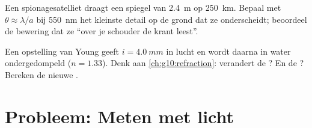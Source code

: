 \begin{exercise}[$\star\star\star$]\label{exo:g12:light-as-wave:14}
Een spionagesatelliet draagt een spiegel van \qty{2.4}{m} op
\qty{250}{km}. Bepaal met $\theta \approx \lambda/a$ bij \qty{550}{nm}
het kleinste detail op de grond dat ze onderscheidt; beoordeel de bewering
dat ze ``over je schouder de krant leest''.
\end{exercise}

\begin{exercise}[$\star\star\star$]\label{exo:g12:light-as-wave:15}
Een opstelling van Young geeft $i = \qty{4.0}{mm}$ in lucht en wordt
daarna in water ondergedompeld ($n = 1.33$). Denk aan
\cref{ch:g10:refraction}: verandert de ? En de ?
Bereken de nieuwe .
\end{exercise}

\section{Probleem: Meten met licht}

